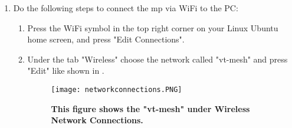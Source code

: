 \begin{enumerate}
\item Do the following steps to connect the \gls{mp} via WiFi to the PC:
\begin{enumerate}
\item Press the WiFi symbol in the top right corner on your Linux Ubuntu home screen, and press "Edit Connections".
\item  Under the tab "Wireless" choose the network called "vt-mesh" and press "Edit" like shown in .
\begin{figure}[h!]
  \centering
      \texttt{[image: networkconnections.PNG]}
  \caption [Network Connections on Linux Ubuntu]{\textbf{This figure shows the "vt-mesh" under Wireless Network Connections.}}
  \label{fig:networkconnections}
\end{figure}


\end{enumerate}
\end{enumerate}

